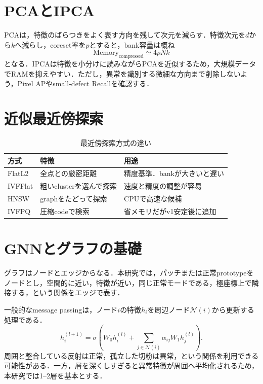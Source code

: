 \documentclass[a4paper,11pt]{ltjsarticle}
\begin{document}
\section{PCAとIPCA}
PCAは，特徴のばらつきをよく表す方向を残して次元を減らす．特徴次元を$d$から$k$へ減らし，coreset率を$p$とすると，bank容量は概ね
\begin{equation}
\mathrm{Memory}_{\mathrm{compressed}}\simeq 4pNk
\end{equation}
となる．IPCAは特徴を小分けに読みながらPCAを近似するため，大規模データでRAMを抑えやすい．ただし，異常を識別する微細な方向まで削除しないよう，Pixel APやsmall-defect Recallを確認する．

\section{近似最近傍探索}
\begin{table}[H]
\centering
\caption{最近傍探索方式の違い}
\begin{tabularx}{\linewidth}{L{30mm}L{34mm}Y}
\toprule
方式 & 特徴 & 用途 \\
\midrule
FlatL2 & 全点との厳密距離 & 精度基準．bankが大きいと遅い \\
IVFFlat & 粗いclusterを選んで探索 & 速度と精度の調整が容易 \\
HNSW & graphをたどって探索 & CPUで高速な候補 \\
IVFPQ & 圧縮codeで検索 & 省メモリだがv1安定後に追加 \\
\bottomrule
\end{tabularx}
\end{table}

\section{GNNとグラフの基礎}
グラフはノードとエッジからなる．本研究では，パッチまたは正常prototypeをノードとし，空間的に近い，特徴が近い，同じ正常モードである，極座標上で隣接する，という関係をエッジで表す．

一般的なmessage passingは，ノード$i$の特徴$h_i$を周辺ノード$\mathcal{N}(i)$から更新する処理である．
\begin{equation}
h_i^{(l+1)}=\sigma\left(W_0h_i^{(l)}+\sum_{j\in\mathcal{N}(i)}\alpha_{ij}W_1h_j^{(l)}\right).
\end{equation}
周囲と整合している反射は正常，孤立した切粉は異常，という関係を利用できる可能性がある．一方，層を深くしすぎると異常特徴が周囲へ平均化されるため，本研究では1--2層を基本とする．
\end{document}
